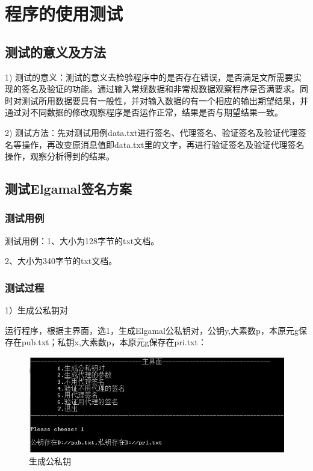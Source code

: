 \section{程序的使用测试}

\subsection{测试的意义及方法}

1)  测试的意义：测试的意义去检验程序中的是否存在错误，是否满足文所需要实现的签名及验证的功能。通过输入常规数据和非常规数据观察程序是否满要求。同时对测试所用数据要具有一般性，并对输入数据的有一个相应的输出期望结果，并通过对不同数据的修改观察程序是否运作正常，结果是否与期望结果一致。

2)  测试方法：先对测试用例data.txt进行签名、代理签名、验证签名及验证代理签名等操作，再改变原消息值即data.txt里的文字，再进行验证签名及验证代理签名操作，观察分析得到的结果。

\subsection{测试Elgamal签名方案}

\subsubsection{测试用例}

测试用例：1、大小为128字节的txt文档。

          2、大小为340字节的txt文档。

\subsubsection{测试过程}

1）生成公私钥对

    运行程序，根据主界面，选1，生成Elgamal公私钥对，公钥y,大素数p，本原元g保存在pub.txt；私钥x,大素数p，本原元g保存在pri.txt：

\begin{figure}[H]
\centering
\includegraphics{img/7.jpg}
\caption{生成公私钥}
\end{figure}

